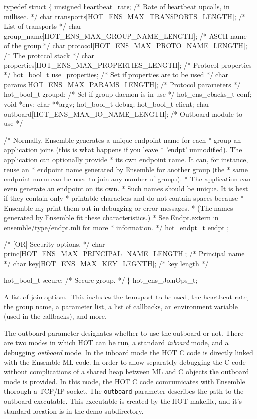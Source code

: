 \documentclass[11pt]{article}
\begin{document}
\begin{codebox}
typedef struct \{
    unsigned heartbeat_rate;	/* Rate of heartbeat upcalls, in millisec. */
    char transports[HOT_ENS_MAX_TRANSPORTS_LENGTH]; /* List of transports */
    char group_name[HOT_ENS_MAX_GROUP_NAME_LENGTH]; /* ASCII name of the group */
    char protocol[HOT_ENS_MAX_PROTO_NAME_LENGTH]; /* The protocol stack */
    char properties[HOT_ENS_MAX_PROPERTIES_LENGTH]; /* Protocol properties */
    hot_bool_t use_properties;		/* Set if properties are to be used */
    char params[HOT_ENS_MAX_PARAMS_LENGTH]; /* Protocol parameters */
    hot_bool_t groupd;			/* Set if group daemon is in use */
    hot_ens_cbacks_t conf;
    void *env;
    char **argv;
    hot_bool_t debug;
    hot_bool_t client;
    char outboard[HOT_ENS_MAX_IO_NAME_LENGTH]; /* Outboard module to use */

    /* Normally, Ensemble generates a unique endpoint name for each
     * group an application joins (this is what happens if you leave
     * 'endpt' unmodified).  The application can optionally provide
     * its own endpoint name.  It can, for instance, reuse an
     * endpoint name generated by Ensemble for another group (the
     * same endpoint name can be used to join any number of groups).
     * The application can even generate an endpoint on its own.
     * Such names should be unique.  It is best if they contain only
     * printable characters and do not contain spaces because
     * Ensemble my print them out in debugging or error messages.
     * (The names generated by Ensemble fit these characteristics.)
     * See Endpt.extern in ensemble/type/endpt.mli for more
     * information.
     */
    hot_endpt_t endpt ;

    /* [OR] Security options. 
     */
    char princ[HOT_ENS_MAX_PRINCIPAL_NAME_LENGTH]; /* Principal name */
    char key[HOT_ENS_MAX_KEY_LEGNTH];             /* key length */

    hot_bool_t secure;                      /* Secure group. */
\} hot_ens_JoinOps_t;
\end{codebox}
A list of join options. This includes the transport to be used, the
heartbeat rate, the group name, a parameter list, a list of callbacks,
an environment variable (used in the callbacks), and more. 

The outboard parameter designates whether to use the outboard or not. 
There are two modes in which HOT can be run, a standard {\it inboard} mode,
and a debugging {\it outboard} mode. In the inboard mode the HOT C
code is directly linked with the Ensemble ML code. In order to allow
separately debugging the C code without complications of a shared heap
between ML and C objects the outboard mode is provided. In this mode,
the HOT C code communicates with Ensemble thorough a TCP/IP
socket. The {\tt outboard} parameter describes the path to the
outboard executable. This executable is created by the HOT makefile,
and it's standard location is in the demo subdirectory.
\end{document}
